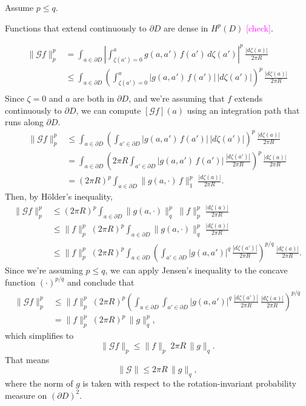 \documentclass{article}
\theoremstyle{plain}
\begin{document}
\color{SeaGreen}
Assume $p \le q$.

Functions that extend continuously to $\partial D$ are dense in $H^p(D)$ \textcolor{magenta}{[check]}.
\color{black}

\begin{align*}
\|\mathcal{G}f\|_p^p & = \int_{a \in \partial D} \left|\int_{\zeta(a') = 0}^{a} g(a, a')\,f(a')\,d\zeta(a') \right|^p\,\frac{|d\zeta(a)|}{2\pi R} \\
& \le \int_{a \in \partial D} \left(\int_{\zeta(a') = 0}^{a} |g(a, a')\,f(a')|\,|d\zeta(a')| \right)^p\,\frac{|d\zeta(a)|}{2\pi R} \\
\end{align*}
Since $\zeta = 0$ and $a$ are both in $\partial D$, and we're assuming that $f$ extends continuously to $\partial D$, we can compute $[\mathcal{G}f](a)$ using an integration path that runs along $\partial D$.
\begin{align*}
\|\mathcal{G}f\|_p^p & \le \int_{a \in \partial D} \left(\int_{a' \in \partial D} |g(a, a')\,f(a')|\,|d\zeta(a')| \right)^p\,\frac{|d\zeta(a)|}{2\pi R} \\
& = \int_{a \in \partial D} \left(2\pi R \int_{a' \in \partial D} |g(a, a')\,f(a')|\,\frac{|d\zeta(a')|}{2\pi R} \right)^p\,\frac{|d\zeta(a)|}{2\pi R} \\
& = (2\pi R)^p \int_{a \in \partial D} \|g(a, \cdot)\,f\|_1^p\;\frac{|d\zeta(a)|}{2\pi R}.
\end{align*}
Then, by H\"{o}lder's inequality,
\begin{align*}
\|\mathcal{G}f\|_p^p & \le (2\pi R)^p \int_{a \in \partial D} \|g(a, \cdot)\|_q^p\;\|f\|_p^p\;\frac{|d\zeta(a)|}{2\pi R} \\
& \le \|f\|_p^p\;(2\pi R)^p \int_{a \in \partial D} \|g(a, \cdot)\|_q^p\;\frac{|d\zeta(a)|}{2\pi R} \\
& \le \|f\|_p^p\;(2\pi R)^p \int_{a \in \partial D} \left( \int_{a' \in \partial D} |g(a, a')|^q\,\frac{|d\zeta(a')|}{2\pi R} \right)^{p/q}\,\frac{|d\zeta(a)|}{2\pi R}.
\end{align*}
Since we're assuming $p \le q$, we can apply Jensen's inequality to the concave function $(\cdot)^{p/q}$ and conclude that
\begin{align*}
\|\mathcal{G}f\|_p^p & \le \|f\|_p^p\;(2\pi R)^p \left( \int_{a \in \partial D} \int_{a' \in \partial D} |g(a, a')|^q\,\frac{|d\zeta(a')|}{2\pi R}\,\frac{|d\zeta(a)|}{2\pi R} \right)^{p/q} \\
& = \|f\|_p^p\;(2\pi R)^p\,\|g\|_q^p,
\end{align*}
which simplifies to
\[ \|\mathcal{G}f\|_p \le \|f\|_p\;2\pi R\,\|g\|_q. \]
That means
\[ \|\mathcal{G}\| \le 2\pi R\,\|g\|_q, \]
where the norm of $g$ is taken with respect to the rotation-invariant probability measure on $(\partial D)^2$.
\end{document}
